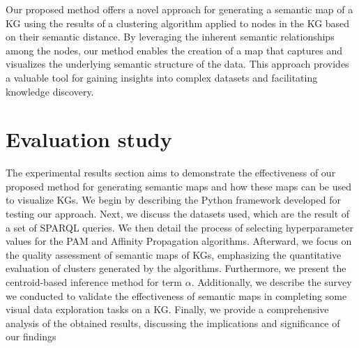 \documentclass{ieeeaccess}
\begin{document}
Our proposed method offers a novel approach for 
generating a semantic map of a KG using the results
of a clustering algorithm applied to nodes in the KG 
based on their semantic distance. By leveraging the 
inherent semantic relationships among the nodes, our 
method enables the creation of a map that captures and 
visualizes the underlying semantic structure of the 
data. This approach provides a valuable tool for 
gaining insights into complex datasets and facilitating 
knowledge discovery.

\section{Evaluation study}
\label{sec:results}

The experimental results section aims to 
demonstrate the effectiveness of our proposed 
method for generating semantic maps and how these
maps can be used to visualize KGs. We begin by 
describing the Python framework developed for 
testing our approach. Next, we discuss the 
datasets used, which are the result of a set of 
SPARQL queries. We then detail the process of 
selecting hyperparameter values for the PAM and 
Affinity Propagation algorithms. Afterward, we 
focus on the quality assessment of semantic maps 
of KGs, emphasizing the quantitative evaluation of
clusters generated by the algorithms. Furthermore,
we present the centroid-based inference method for
term $\alpha$. Additionally, we describe the
survey we conducted to validate the effectiveness
of semantic maps in completing some visual data 
exploration tasks on a KG. Finally, we provide a 
comprehensive analysis of the obtained results, 
discussing the implications and significance of 
our findings
\end{document}
